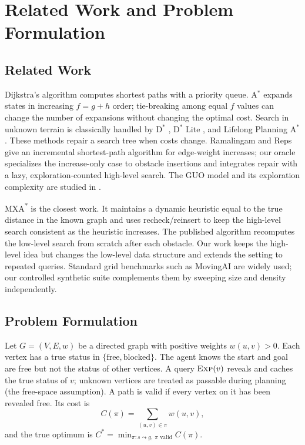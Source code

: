 \documentclass[conference]{IEEEtran}
\newcommand{\Exp}{\textsc{Exp}}
\newcommand{\MXA}{MXA\textsuperscript{*}}
\begin{document}
\section{Related Work and Problem Formulation}
\label{sec:related}
\subsection{Related Work}
Dijkstra's algorithm \cite{dijkstra1959} computes shortest paths with a priority queue. A$^*$ \cite{hart1968} expands states in increasing $f=g+h$ order; tie-breaking among equal $f$ values can change the number of expansions without changing the optimal cost. Search in unknown terrain is classically handled by D$^*$ \cite{stentz1994}, D$^*$ Lite \cite{koenig2002}, and Lifelong Planning A$^*$ \cite{koenig2004}. These methods repair a search tree when costs change. Ramalingam and Reps \cite{ramalingam1996} give an incremental shortest-path algorithm for edge-weight increases; our oracle specializes the increase-only case to obstacle insertions and integrates repair with a lazy, exploration-counted high-level search. The GUO model and its exploration complexity are studied in \cite{koenig2003,korf1990}.

\MXA{} \cite{koyfman2024} is the closest work. It maintains a dynamic heuristic equal to the true distance in the known graph and uses recheck/reinsert to keep the high-level search consistent as the heuristic increases. The published algorithm recomputes the low-level search from scratch after each obstacle. Our work keeps the high-level idea but changes the low-level data structure and extends the setting to repeated queries. Standard grid benchmarks such as MovingAI \cite{sturtevant2012} are widely used; our controlled synthetic suite complements them by sweeping size and density independently.

\subsection{Problem Formulation}
Let $G=(V,E,w)$ be a directed graph with positive weights $w(u,v)>0$. Each vertex has a true status in $\{\text{free},\text{blocked}\}$. The agent knows the start and goal are free but not the status of other vertices. A query $\Exp(v)$ reveals and caches the true status of $v$; unknown vertices are treated as passable during planning (the free-space assumption). A path is valid if every vertex on it has been revealed free. Its cost is
\begin{equation}
C(\pi)=\sum_{(u,v)\in\pi} w(u,v),
\end{equation}
and the true optimum is $C^*=\min_{\pi:s\leadsto g,\ \pi\text{ valid}} C(\pi)$.
\end{document}
